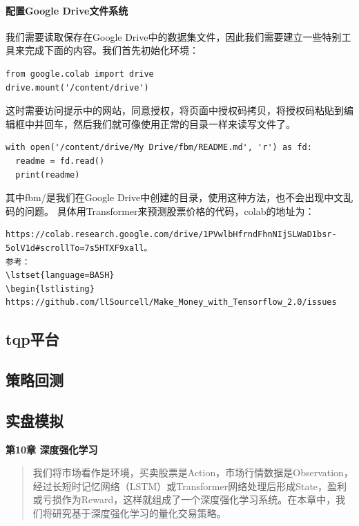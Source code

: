 \documentclass{article}
\begin{document}
\paragraph{配置Google Drive文件系统}
我们需要读取保存在Google Drive中的数据集文件，因此我们需要建立一些特别工具来完成下面的内容。我们首先初始化环境：
\begin{lstlisting}
from google.colab import drive
drive.mount('/content/drive')
\end{lstlisting}
这时需要访问提示中的网站，同意授权，将页面中授权码拷贝，将授权码粘贴到编辑框中并回车，然后我们就可像使用正常的目录一样来读写文件了。
\begin{lstlisting}
with open('/content/drive/My Drive/fbm/README.md', 'r') as fd:
  readme = fd.read()
  print(readme)
\end{lstlisting}
其中fbm/是我们在Google Drive中创建的目录，使用这种方法，也不会出现中文乱码的问题。
具体用Transformer来预测股票价格的代码，colab的地址为：
\lstset{language=BASH}
\begin{lstlisting}
https://colab.research.google.com/drive/1PVwlbHfrndFhnNIjSLWaD1bsr-5olV1d#scrollTo=7s5HTXF9xall。
参考：
\lstset{language=BASH}
\begin{lstlisting}
https://github.com/llSourcell/Make_Money_with_Tensorflow_2.0/issues
\end{lstlisting}
\subsection{tqp平台}
\subsection{策略回测}
\subsection{实盘模拟}

\maketitle\begin{center}
\Large \textbf{第10章 深度强化学习}
\end{center}
\begin{abstract}
我们将市场看作是环境，买卖股票是Action，市场行情数据是Observation，经过长短时记忆网络（LSTM）或Transformer网络处理后形成State，盈利或亏损作为Reward，这样就组成了一个深度强化学习系统。在本章中，我们将研究基于深度强化学习的量化交易策略。
\end{abstract}
\end{document}
